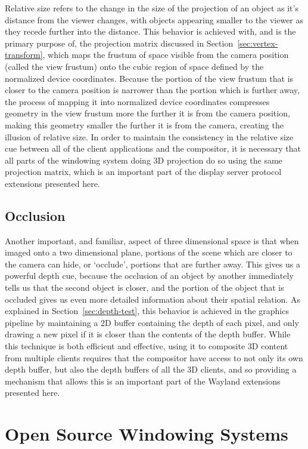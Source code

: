 Relative size refers to the change in the size of the projection of an object as it's distance from the viewer changes, with objects appearing smaller to the viewer as they recede further into the distance. This behavior is achieved with, and is the primary purpose of, the projection matrix discussed in Section~\ref{sec:vertex-transform}, which maps the frustum of space visible from the camera position (called the view frustum) onto the cubic region of space defined by the normalized device coordinates. Because the portion of the view frustum that is closer to the camera position is narrower than the portion which is further away, the process of mapping it into normalized device coordinates compresses geometry in the view frustum more the further it is from the camera position, making this geometry smaller the further it is from the camera, creating the illusion of relative size. In order to maintain the consistency in the relative size cue between all of the client applications and the compositor, it is necessary that all parts of the windowing system doing 3D projection do so using the same projection matrix, which is an important part of the display server protocol extensions presented here.

\subsection{Occlusion}

Another important, and familiar, aspect of three dimensional space is that when imaged onto a two dimensional plane, portions of the scene which are closer to the camera can hide, or `occlude', portions that are further away. This gives us a powerful depth cue, because the occlusion of an object by another immediately tells us that the second object is closer, and the portion of the object that is occluded gives us even more detailed information about their spatial relation. As explained in Section~\ref{sec:depth-test}, this behavior is achieved in the graphics pipeline by maintaining a 2D buffer containing the depth of each pixel, and only drawing a new pixel if it is closer than the contents of the depth buffer. While this technique is both efficient and effective, using it to composite 3D content from multiple clients requires that the compositor have access to not only its own depth buffer, but also the depth buffers of all the 3D clients, and so providing a mechanism that allows this is an important part of the Wayland extensions presented here. 

\section{Open Source Windowing Systems}

